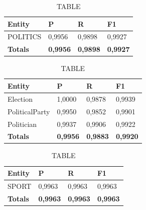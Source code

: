 \documentclass[thesis=M,english]{FITthesis}[2018/05/30]
\begin{document}
	\begin{table}[H]\centering
		\caption{TABLE}
		\label{}
		\begin{tabular}{|l|l|l|l|}
			\hline {\textbf{Entity}} & {\textbf{P}} & {\textbf{R}} & {\textbf{F1}}\\\hline
				POLITICS & 0,9956 & 0,9898 & 0,9927\\\hline
				\textbf{Totals} & \textbf{0,9956} & \textbf{0,9898} & \textbf{0,9927}\\\hline
		\end{tabular}
	\end{table}

	\begin{table}[H]\centering
		\caption{TABLE}
		\label{}
		\begin{tabular}{|l|l|l|l|}
			\hline {\textbf{Entity}} & {\textbf{P}} & {\textbf{R}} & {\textbf{F1}}\\\hline
				Election & 1,0000 & 0,9878 & 0,9939\\
				PoliticalParty & 0,9950 & 0,9852 & 0,9901\\
				Politician & 0,9937 & 0,9906 & 0,9922\\\hline
				\textbf{Totals} & \textbf{0,9956} & \textbf{0,9883} & \textbf{0,9920}\\\hline
		\end{tabular}
	\end{table}	
	

	\begin{table}[H]\centering
		\caption{TABLE}
		\label{}
		\begin{tabular}{|l|l|l|l|}
			\hline {\textbf{Entity}} & {\textbf{P}} & {\textbf{R}} & {\textbf{F1}}\\\hline
				SPORT & 0,9963 & 0,9963 & 0,9963\\\hline
				\textbf{Totals} & \textbf{0,9963} & \textbf{0,9963} & \textbf{0,9963}\\\hline
		\end{tabular}
	\end{table}
\end{document}

